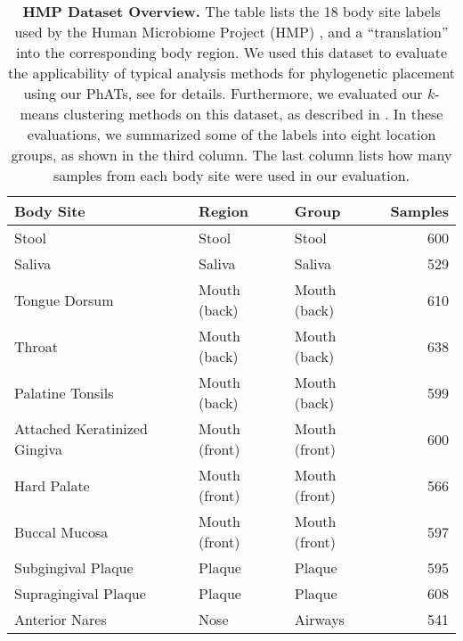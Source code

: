 \begin{table}[htb]
\caption[HMP Dataset Overview]{
\textbf{HMP Dataset Overview.}
The table lists the \num{18} body site labels used by the Human Microbiome Project (HMP) \citep{Huttenhower2012,Methe2012},
and a ``translation'' into the corresponding body region.
We used this dataset to evaluate the applicability of typical analysis methods for phylogenetic placement
using our \acp{PhAT}, see  for details.
Furthermore, we evaluated our $k$-means clustering methods on this dataset,
as described in .
In these evaluations,
we summarized some of the labels into eight location groups, as shown in the third column.
The last column lists how many samples from each body site were used in our evaluation.
}
\label{tab:hmp_data_overview}
{
    \begin{center}
    \begin{tabular}{lllr}
        \toprule
        Body Site                       & Region            & Group             & Samples   \\
        \midrule
        Stool                           & Stool             & Stool             & 600   \\
        Saliva                          & Saliva            & Saliva            & 529   \\
        Tongue Dorsum                   & Mouth (back)      & Mouth (back)      & 610   \\
        Throat                          & Mouth (back)      & Mouth (back)      & 638   \\
        Palatine Tonsils                & Mouth (back)      & Mouth (back)      & 599   \\
        Attached Keratinized Gingiva    & Mouth (front)     & Mouth (front)     & 600   \\
        Hard Palate                     & Mouth (front)     & Mouth (front)     & 566   \\
        Buccal Mucosa                   & Mouth (front)     & Mouth (front)     & 597   \\
        Subgingival Plaque              & Plaque            & Plaque            & 595   \\
        Supragingival Plaque            & Plaque            & Plaque            & 608   \\
        Anterior Nares                  & Nose              & Airways           & 541   \\

\end{tabular}
\end{center}}
\end{table}
